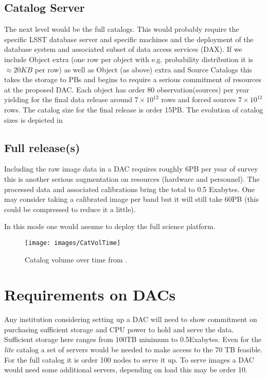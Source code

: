 \subsection{Catalog Server}
The next level would be the full catalogs. This would probably require the specific LSST database server  and specific machines and the deployment of the database system and associated subset of data access services (DAX). If we include Object extra (one row per object with e.g. probability distribution it is $\approx 20KB $ per row)  as well as  Object (as above)  extra and Source Catalogs this takes the storage to PBs and begins to require a serious commitment of resources at the proposed DAC. Each object has order 80 observation(sources) per year yielding for the final data release around $7 \times 10^{12} $ rows and forced sources $7 \times 10^{12}$ rows.  The catalog size for the final release is order 15PB.  The evolution of catalog sizes is depicted in 

\subsection{Full release(s)}
Including the raw image data in a DAC requires roughly 6PB per year of survey this is another serious augmentation on resources (hardware and personnel). The processed data and associated calibrations bring the total  to 0.5 Exabytes.  One may consider taking a  calibrated image per band
but it will still take 60PB (this could be compressed to reduce it a little).

In this mode one would assume to deploy the full science platform.


\begin{figure}
\begin{center}
\texttt{[image: images/CatVolTime]}
\caption{Catalog volume over time from . \label{fig:catvol}}
\end{center}
\end{figure}


\section{Requirements on DACs}
Any institution considering setting up a DAC will need to show commitment on purchasing sufficient storage and CPU power to hold and serve the data.
Sufficient storage here ranges from 100TB minimum to 0.5Exabytes.  Even for the \emph{lite} catalog a set of servers would be needed to make access to the 70 TB feasible. For the full catalog it is order 100 nodes to serve it up.   To serve images a DAC would need some additional servers, depending on load this may be order 10.

